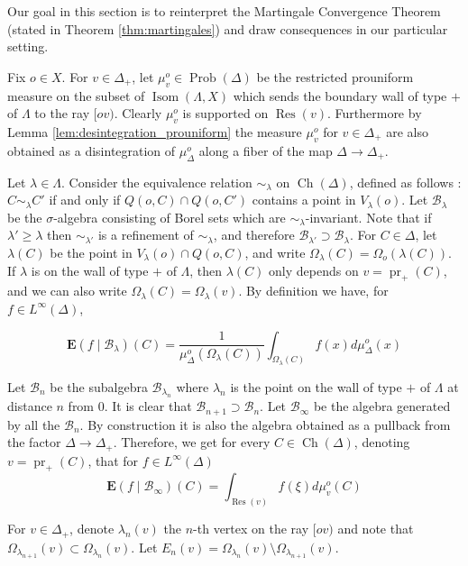 \documentclass[a4paper, 11pt]{article}
\theoremstyle{plain}
\theoremstyle{definition}
\theoremstyle{remark}
\DeclareMathOperator{\Ch}{Ch}
\DeclareMathOperator{\Res}{Res}
\DeclareMathOperator{\Isom}{Isom}
\DeclareMathOperator{\pr}{pr}
\DeclareMathOperator{\Prob}{Prob}
\newcommand{\calB}{\mathcal{B}}
\newcommand{\EE}{\mathbf E}
\begin{document}
Our goal in this section is to reinterpret the Martingale Convergence Theorem (stated in Theorem \ref{thm:martingales}) and draw consequences in our particular setting.

Fix $o\in X$. For $v\in\Delta_+$, let $\mu_v^o\in \Prob(\Delta)$ \index{$\mu_v^o$\hfill prouniform measure on $\Res(v)$|bb} be the restricted prouniform measure on the subset of $\Isom(\Lambda,X)$ which sends the boundary wall of type $+$ of $\Lambda$ to the ray $[ov)$. Clearly $\mu_v^o$ is supported on $\Res(v)$. Furthermore by Lemma \ref{lem:desintegration_prouniform} the measure $\mu_v^o$ for $v\in\Delta_+$ are also obtained as a disintegration of $\mu_\Delta^o$ along a fiber of the map $\Delta\to\Delta_+$.


Let $\lambda \in \Lambda$. 
Consider the equivalence relation $\sim_\lambda$ on $\Ch(\Delta)$, defined as follows : $C\sim_\lambda C'$ if and only if $Q(o,C)\cap Q(o,C')$ contains a point in $V_\lambda(o)$. Let $\calB_\lambda$ be the $\sigma$-algebra consisting of Borel sets which are $\sim_\lambda$-invariant. Note that if $\lambda'\geq \lambda$ then $\sim_{\lambda'}$ is a refinement of $\sim_\lambda$, and therefore $\calB_{\lambda'} \supset  \calB_\lambda$. For $C\in \Delta$, let $\lambda(C)$ be the point in $V_\lambda(o)\cap Q(o,C)$, and write  $\Omega_\lambda(C)=\Omega_o(\lambda(C))$. If $\lambda$ is on the wall of type $+$ of $\Lambda$, then $\lambda(C)$ only depends on $v=\pr_+(C)$, and we can also write $\Omega_\lambda(C)=\Omega_\lambda(v)$. By definition we have, for $f\in L^\infty(\Delta)$, 

$$\EE(f\mid \calB_\lambda)(C)=\frac{1}{\mu_\Delta^o(\Omega_\lambda(C))}\int_{\Omega_\lambda(C)} f(x)d\mu_\Delta^o(x)$$

Let $\calB_n$ be the subalgebra $\calB_{\lambda_n}$ where $\lambda_n$ is the point on the wall of type $+$ of $\Lambda$ at distance $n$ from $0$. It is clear that $\calB_{n+1}\supset \calB_n$. Let $\calB_\infty$ be the algebra generated by all the $\calB_n$. By construction it is also the algebra obtained as a pullback from the factor $\Delta\to\Delta_+$. Therefore, we get for every $C\in\Ch(\Delta)$, denoting $v=\pr_+(C)$, that for $f\in L^\infty(\Delta)$ 
$$\EE(f\mid \calB_{\infty})(C)= \int_{\Res(v)} f(\xi) d\mu_v^o(C)  $$



For $v\in \Delta_+$, denote $\lambda_n(v)$ the $n$-th vertex on the ray $[ov)$ and note that $\Omega_{\lambda_{n+1}}(v)\subset \Omega_{\lambda_n}(v)$. Let $E_n(v)=\Omega_{\lambda_n}(v)\setminus \Omega_{\lambda_{n+1}}(v)$. 
\end{document}
